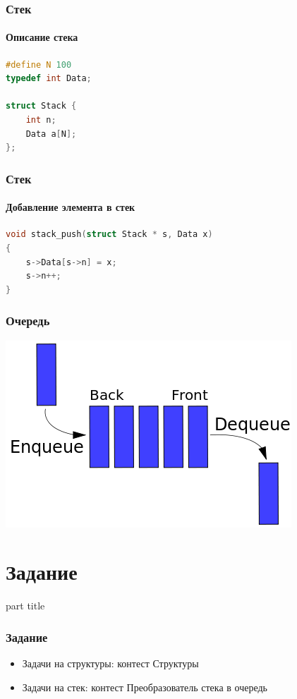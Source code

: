 \documentclass[14pt,pdf,hyperref={unicode}]{beamer}
\begin{document}
\begin{frame}[fragile]
\frametitle{Стек} 
\framesubtitle{Описание стека} 

\begin{lstlisting}[language=C++,basicstyle=\ttfamily,keywordstyle=\color{blue}]
#define N 100
typedef int Data;

struct Stack {
    int n;
    Data a[N];
};
\end{lstlisting}
\end{frame}


\begin{frame}[fragile]
\frametitle{Стек} 
\framesubtitle{Добавление элемента в стек} 

\begin{lstlisting}[language=C++,basicstyle=\ttfamily,keywordstyle=\color{blue}]
void stack_push(struct Stack * s, Data x)
{
	s->Data[s->n] = x;
	s->n++;
}
\end{lstlisting}
\end{frame}


\begin{frame}[fragile]
\frametitle{Очередь} 
\begin{center}
\includegraphics[width=0.8\linewidth]{images/queue.png}
\end{center}
\end{frame}



\section{Задание}
\begin{frame}
\begin{center}
\begin{beamercolorbox}[sep=8pt,center]{part
title}
\insertsection
\end{beamercolorbox}
\end{center}
\end{frame}

\begin{frame}[fragile]
\frametitle{Задание} 
\begin{itemize}
\item Задачи на структуры: контест Структуры
\item Задачи на стек: контест Преобразователь стека в очередь
\end{itemize}
\end{frame}
\end{document}
